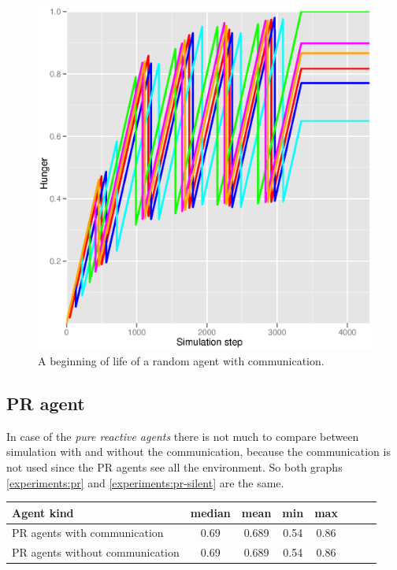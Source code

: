 \begin{figure}[h!]
  \centering                                
  \includegraphics[scale=0.4]{diagrams/experiments/random_start.eps}    
  \caption{A beginning of life of a random agent with communication.}
  \label{experiments:random-start}
\end{figure}        

\subsection{PR agent}

In case of the \emph{pure reactive agents} there is not much to compare between simulation with and without the communication, because the communication is not used since the PR agents see all the environment. So both graphs \ref{experiments:pr} and \ref{experiments:pr-silent} are the same.

\begin{center}   
  \begin{tabular}{l*{6}{c}r}
  Agent kind        & median & mean & min & max \\
  \hline  
  PR agents with communication        & 0.69 & 0.689 & 0.54 & 0.86 \\
  PR agents without communication     & 0.69 & 0.689 & 0.54 & 0.86 \\
  \end{tabular}                  
\end{center}

